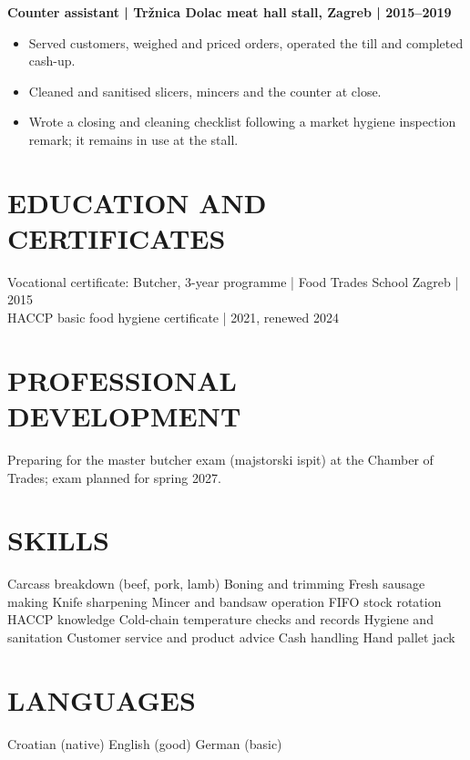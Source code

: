 \documentclass[11pt,a4paper]{article}
\begin{document}
\textbf{Counter assistant | Tržnica Dolac meat hall stall, Zagreb | 2015--2019}
\begin{itemize}
\item Served customers, weighed and priced orders, operated the till and completed cash-up.
\item Cleaned and sanitised slicers, mincers and the counter at close.
\item Wrote a closing and cleaning checklist following a market hygiene inspection remark; it remains in use at the stall.
\end{itemize}

\section*{EDUCATION AND CERTIFICATES}
Vocational certificate: Butcher, 3-year programme | Food Trades School Zagreb | 2015\\
HACCP basic food hygiene certificate | 2021, renewed 2024

\section*{PROFESSIONAL DEVELOPMENT}
Preparing for the master butcher exam (majstorski ispit) at the Chamber of Trades; exam planned for spring 2027.

\section*{SKILLS}
Carcass breakdown (beef, pork, lamb) \textperiodcentered{} Boning and trimming \textperiodcentered{} Fresh sausage making \textperiodcentered{} Knife sharpening \textperiodcentered{} Mincer and bandsaw operation \textperiodcentered{} FIFO stock rotation \textperiodcentered{} HACCP knowledge \textperiodcentered{} Cold-chain temperature checks and records \textperiodcentered{} Hygiene and sanitation \textperiodcentered{} Customer service and product advice \textperiodcentered{} Cash handling \textperiodcentered{} Hand pallet jack

\section*{LANGUAGES}
Croatian (native) \textperiodcentered{} English (good) \textperiodcentered{} German (basic)
\end{document}
